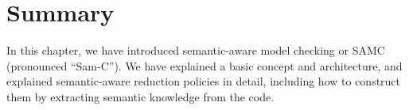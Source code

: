 \section{Summary}
In this chapter, we have introduced semantic-aware model checking or SAMC (pronounced
``Sam-C''). We have explained a basic concept and architecture, and explained
semantic-aware reduction policies in detail, including how to construct them by
extracting semantic knowledge from the code.
